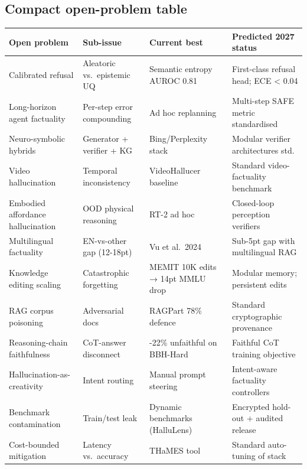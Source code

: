\subsection{Compact open-problem table}\label{compact-open-problem-table}

{\def\LTcaptype{none} %
\begin{longtable}[]{@{}
  >{\raggedright\arraybackslash}p{}
  >{\raggedright\arraybackslash}p{}
  >{\raggedright\arraybackslash}p{}
  >{\raggedright\arraybackslash}p{}@{}}
\toprule\noalign{}
\begin{minipage}[b]{\linewidth}\raggedright
Open problem
\end{minipage} & \begin{minipage}[b]{\linewidth}\raggedright
Sub-issue
\end{minipage} & \begin{minipage}[b]{\linewidth}\raggedright
Current best
\end{minipage} & \begin{minipage}[b]{\linewidth}\raggedright
Predicted 2027 status
\end{minipage} \\
\midrule\noalign{}
\endhead
\bottomrule\noalign{}
\endlastfoot
Calibrated refusal & Aleatoric vs.~epistemic UQ & Semantic entropy AUROC 0.81 & First-class refusal head; ECE \textless{} 0.04 \\
Long-horizon agent factuality & Per-step error compounding & Ad hoc replanning & Multi-step SAFE metric standardised \\
Neuro-symbolic hybrids & Generator + verifier + KG & Bing/Perplexity stack & Modular verifier architectures std. \\
Video hallucination & Temporal inconsistency & VideoHallucer baseline & Standard video-factuality benchmark \\
Embodied affordance hallucination & OOD physical reasoning & RT-2 ad hoc & Closed-loop perception verifiers \\
Multilingual factuality & EN-vs-other gap (12-18pt) & Vu et al.~2024 & Sub-5pt gap with multilingual RAG \\
Knowledge editing scaling & Catastrophic forgetting & MEMIT 10K edits → 14pt MMLU drop & Modular memory; persistent edits \\
RAG corpus poisoning & Adversarial docs & RAGPart 78\% defence & Standard cryptographic provenance \\
Reasoning-chain faithfulness & CoT-answer disconnect & 14-22\% unfaithful on BBH-Hard & Faithful CoT training objective \\
Hallucination-as-creativity & Intent routing & Manual prompt steering & Intent-aware factuality controllers \\
Benchmark contamination & Train/test leak & Dynamic benchmarks (HalluLens) & Encrypted hold-out + audited release \\
Cost-bounded mitigation & Latency vs.~accuracy & THaMES tool & Standard auto-tuning of stack \\
\end{longtable}
}

